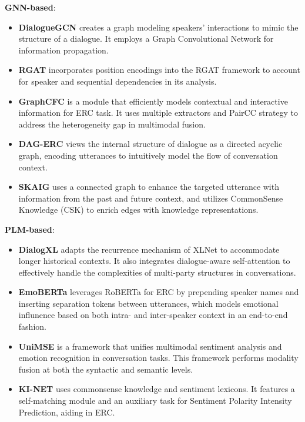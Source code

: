\documentclass[conference]{IEEEtran}
\begin{document}
\textbf{GNN-based}: 
\begin{itemize}
\item \textbf{DialogueGCN} \cite{ghosal2019dialoguegcn} creates a graph modeling speakers' interactions to mimic the structure of a dialogue. It employs a Graph Convolutional Network for information propagation.
\item \textbf{RGAT} \cite{ishiwatari2020relation} incorporates position encodings into the RGAT framework to account for speaker and sequential dependencies in its analysis.
\item \textbf{GraphCFC} \cite{li2023graphcfc} is a module that efficiently models contextual and interactive information for ERC task. It uses multiple extractors and PairCC strategy to address the heterogeneity gap in multimodal fusion.
\item \textbf{DAG-ERC} \cite{shen2021directed} views the internal structure of dialogue as a directed acyclic graph, encoding utterances to intuitively model the flow of conversation context.
\item \textbf{SKAIG} \cite{li2021past} uses a connected graph to enhance the targeted utterance with information from the past and future context, and utilizes CommonSense Knowledge (CSK) to enrich edges with knowledge representations.
\end{itemize}

\textbf{PLM-based}:
\begin{itemize}
\item \textbf{DialogXL} \cite{shen2021dialogxl} adapts the recurrence mechanism of XLNet to accommodate longer historical contexts. It also integrates dialogue-aware self-attention to effectively handle the complexities of multi-party structures in conversations.
\item \textbf{EmoBERTa} \cite{kim2021emoberta} leverages RoBERTa for ERC by prepending speaker names and inserting separation tokens between utterances, which models emotional influnence based on both intra- and inter-speaker context in an end-to-end fashion.
\item \textbf{UniMSE} \cite{lu-etal-2022-unified} is a framework that unifies multimodal sentiment analysis and emotion recognition in conversation tasks. This framework performs modality fusion at both the syntactic and semantic levels.
\item \textbf{KI-NET} \cite{freudenthaler2022ki} uses commonsense knowledge and sentiment lexicons. It features a self-matching module and an auxiliary task for Sentiment Polarity Intensity Prediction, aiding in ERC.
\end{itemize}
\end{document}
